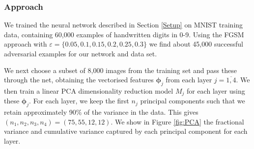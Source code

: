 \subsubsection{Approach}

We trained the neural network described in Section \ref{Setup} on MNIST training data, containing 60,000 examples of handwritten digits in 0-9.  Using the FGSM approach with $\varepsilon =\{0.05,0.1,0.15,0.2,0.25,0.3\}$ we find about 45,000 successful adversarial examples for our network and data set.
\par
We next choose a subset of 8,000 images from the training set and pass these through the net, obtaining the vectorised features $\boldsymbol{\phi}_{j}$ from each layer $j=\overline{1,4}$. We then train a linear PCA dimensionality reduction model $M_j$ for each layer using these $\boldsymbol{\phi}_j$. For each layer, we keep the first $n_j$ principal components such that we retain approximately 90\% of the variance in the data. This gives $(n_1, n_2, n_3, n_4) = (75, 55, 12, 12)$. We show in Figure \ref{fig:PCA} the fractional variance and cumulative variance captured by each principal component for each layer.

